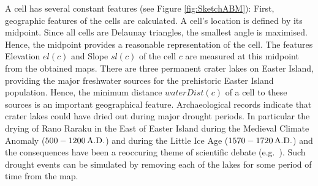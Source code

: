 A cell has several constant features (see Figure \ref{fig:SketchABM}):
First, geographic features of the cells are calculated.
A cell's location is defined by its midpoint. Since all cells are Delaunay triangles, the smallest angle is maximised. Hence, the midpoint provides a reasonable representation of the cell.
The features Elevation $el(c)$ and Slope $sl(c)$ of the cell $c$ are measured at this midpoint from the obtained maps.
There are three permanent crater lakes on Easter Island, providing the major freshwater sources for the prehistoric Easter Island population. Hence, the minimum distance $waterDist(c)$ of a cell to these sources is an important geographical feature.
Archaeological records indicate that crater lakes could have dried out during major drought periods.
In particular the drying of Rano Raraku in the East of Easter Island during the Medieval Climate Anomaly ($500-1200 \, \rm{A.D.}$) and during the Little Ice Age ($1570-1720\, \rm{A.D.}$) \citep{Rull2020} and the consequences have been a reoccuring theme of scientific debate (e.g.\ \citet{Cauwe2011}). 
Such drought events can be simulated by removing each of the lakes for some period of time from the map.


